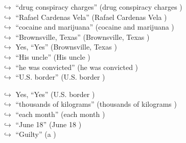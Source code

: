 \documentclass[11pt,a4paper, onecolumn]{article}
\begin{document}
\begin{figure}[t] \small \begin{tcolorbox}[boxsep=0pt,left=5pt,right=0pt,top=2pt,colback = yellow!5] \begin{dialogue}
 \small 
\colorbox{pink!25}{$\hookrightarrow$}
{ ``drug conspiracy charges'' (drug conspiracy charges ) }
\\
\colorbox{pink!25}{$\hookrightarrow$}
{ ``Rafael Cardenas Vela'' (Rafael Cardenas Vela ) }
\\
\colorbox{pink!25}{$\hookrightarrow$}
{ ``cocaine and marijuana'' (cocaine and marijuana ) }
\\
\colorbox{pink!25}{$\hookrightarrow$}
{ ``Brownsville, Texas'' (Brownsville, Texas ) }
\\
\colorbox{pink!25}{$\hookrightarrow$}
\colorbox{red!25}{Yes,}
{ ``Yes'' (Brownsville, Texas ) }
\\
\colorbox{pink!25}{$\hookrightarrow$}
{ ``His uncle'' (His uncle ) }
\\
\colorbox{pink!25}{$\hookrightarrow$}
{ ``he was convicted'' (he was convicted ) }
\\
\colorbox{pink!25}{$\hookrightarrow$}
{ ``U.S. border'' (U.S. border ) }
 \end{dialogue}\end{tcolorbox}\end{figure}\begin{figure}[t] \small \begin{tcolorbox}[boxsep=0pt,left=5pt,right=0pt,top=2pt,colback = yellow!5] \begin{dialogue}
 \small 
\colorbox{pink!25}{$\hookrightarrow$}
\colorbox{red!25}{Yes,}
{ ``Yes'' (U.S. border ) }
\\
\colorbox{pink!25}{$\hookrightarrow$}
{ ``thousands of kilograms'' (thousands of kilograms ) }
\\
\colorbox{pink!25}{$\hookrightarrow$}
{ ``each month'' (each month ) }
\\
\colorbox{pink!25}{$\hookrightarrow$}
{ ``June 18'' (June 18 ) }
\\
\colorbox{pink!25}{$\hookrightarrow$}
{ ``Guilty'' (a ) }
\\
 \end{dialogue}\end{tcolorbox}\end{figure}
\end{document}
